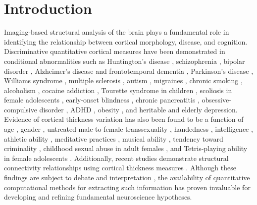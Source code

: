 \section{Introduction}

Imaging-based structural analysis of the brain plays a fundamental role
in identifying the relationship between cortical morphology, disease, and cognition.
Discriminative quantitative cortical measures have been demonstrated in conditional 
abnormalities such as 
Huntington's disease \citep{rosas2002,rosas2005,selemon2004}, 
schizophrenia \citep{nesvag2008}, bipolar disorder \cite{lyoo2006}, Alzheimer's disease and frontotemporal
dementia \citep{du2007,dickerson2009}, Parkinson's disease \citep{jubault2011}, Williams syndrome \citep{thompson2005},
multiple sclerosis \citep{ramasamy2009}, autism \citep{chung2005,hardan2006},
migraines \citep{dasilva2007}, chronic smoking \citep{kuhn2010}, alcoholism \citep{fortier2011},
cocaine addiction \citep{makris2008}, Tourette syndrome in children \citep{sowell2008},
scoliosis in
female adolescents \citep{wang2012}, 
early-onset blindness \citep{jiang2009},
chronic pancreatitis \citep{frokjaer2012},
obsessive-compulsive disorder \citep{shin2007}, ADHD \citep{almeida-montes2012}, obesity \citep{raji2010}, 
and heritable \citep{peterson2009}
and elderly \citep{ballmaier2004} depression.  Evidence of cortical thickness 
variation has also been found to be a function of age \citep{kochunov2011},
gender \citep{luders2006a}, untreated
male-to-female transsexuality \citep{luders2012},  handedness
\citep{luders2006,amunts2007}, intelligence \citep{shaw2006}, athletic
ability \citep{wei2011}, meditative practices \cite{lazar2005}, musical ability \citep{bermudez2009,foster2010}, 
tendency toward criminality \citep{raine2011}, 
childhood sexual abuse in adult females \citep{heim2013},
and Tetris-playing
ability in female adolescents \citep{haier2009}.  Additionally,
recent studies demonstrate structural 
connectivity relationships using cortical thickness measures
\citep{worsley2005,lerch2006,he2007,chen2008}.
Although these findings
are subject to debate and interpretation \citep{gernsbacher2007}, 
the availability of quantitative
computational methods for extracting such information
has proven invaluable for developing and refining fundamental 
neuroscience hypotheses.

